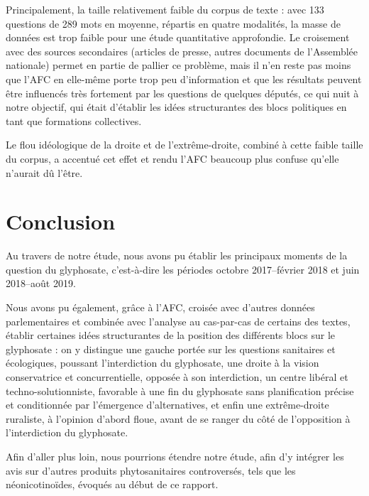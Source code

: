 \documentclass[12pt,twocolumn,landscape]{article}
\begin{document}
    Principalement, la taille relativement faible du corpus de texte :
    avec 133 questions de 289 mots en moyenne, répartis en quatre modalités,
    la masse de données est trop faible pour une étude quantitative
    approfondie.
    Le croisement avec des sources secondaires (articles de presse,
    autres documents de l'Assemblée nationale) permet
    en partie de pallier ce problème,
    mais il n'en reste pas moins que l'AFC en elle-même
    porte trop peu d'information et que les résultats peuvent
    être influencés très fortement par les questions
    de quelques députés, ce qui nuit à notre objectif,
    qui était d'établir les idées structurantes des blocs
    politiques en tant que formations collectives.

    Le flou idéologique de la droite et de l'extrême-droite,
    combiné à cette faible taille du corpus, a accentué
    cet effet et rendu l'AFC beaucoup plus confuse qu'elle n'aurait
    dû l'être.

    \section{Conclusion}\label{sec:conclusion}

    Au travers de notre étude, nous avons pu établir
    les principaux moments de la question du glyphosate,
    c'est-à-dire les périodes octobre 2017--février 2018 et
    juin 2018--août 2019.

    Nous avons pu également, grâce à l'AFC, croisée avec
    d'autres données parlementaires et combinée
    avec l'analyse au cas-par-cas de certains des textes,
    établir certaines idées structurantes de la position
    des différents blocs sur le glyphosate :
    on y distingue une gauche portée sur les questions
    sanitaires et écologiques, poussant l'interdiction
    du glyphosate, une droite à la vision conservatrice et concurrentielle,
    opposée à son interdiction, un centre libéral et techno-solutionniste,
    favorable à une fin du glyphosate sans planification précise
    et conditionnée par l'émergence d'alternatives, et enfin une extrême-droite
    ruraliste, à l'opinion d'abord floue, avant de se ranger du côté
    de l'opposition à l'interdiction du glyphosate.

    Afin d'aller plus loin, nous pourrions étendre notre étude,
    afin d'y intégrer les avis sur d'autres produits phytosanitaires
    controversés, tels que les néonicotinoïdes, évoqués au début de ce rapport.


    \newpage


    \listoffigures

    \newpage

    
\end{document}
